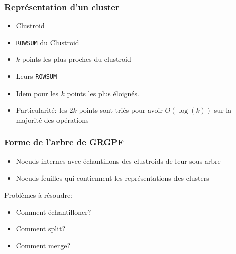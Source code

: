 \documentclass{beamer}
\begin{document}
 	\begin{frame}
 		\frametitle{Représentation d'un cluster}
 		\begin{itemize}
 			\item Clustroid
 			\item \texttt{ROWSUM} du Clustroid
 			\item $k$ points les plus proches du clustroid
 			\item Leurs \texttt{ROWSUM}
 			\item Idem pour les $k$ points les plus éloignés.
 			\item Particularité: les $2k$ points sont \alert{triés} pour avoir $O(\log(k))$ sur la majorité des opérations
 		\end{itemize}
 		
 	\end{frame}
 	
 	\begin{frame}
 		\frametitle{Forme de l'arbre de GRGPF}
 		\begin{itemize}
 			\item Noeuds internes avec échantillons des clustroids de leur sous-arbre
 			\item Noeuds feuilles qui contiennent les représentations des clusters
 		\end{itemize}
 		
 		Problèmes à résoudre:
 		\begin{itemize}
 			\item Comment échantilloner?
 			\item Comment split?
 			\item Comment merge?
 		\end{itemize}
 	\end{frame}
 	
\end{document}
